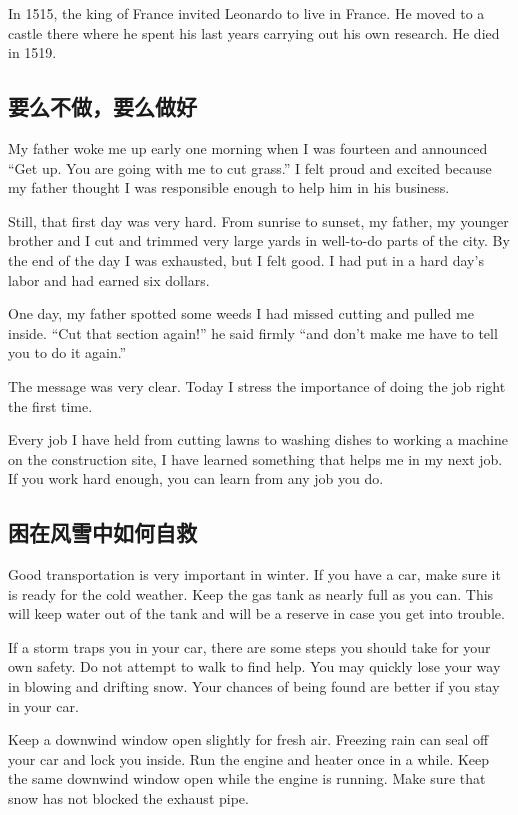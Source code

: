 In 1515, the king of France invited Leonardo to live in
France. He moved to a castle there where he spent his last
years carrying out his own research. He died in 1519.

\subsection{要么不做，要么做好}
My father woke me up early one morning when I was
fourteen and announced “Get up. You are going with me
to cut grass.” I felt proud and excited because my
father thought I was responsible enough to help him in his
business.

Still, that first day was very hard. From sunrise to sunset, my
father, my younger brother and I cut and trimmed very
large yards in well-to-do parts of the city. By
the end of the day I was exhausted, but I felt good. I had
put in a hard day's labor and had earned six dollars.

One day, my father spotted some weeds I had
missed cutting and pulled me inside. “Cut that section
again!” he said firmly “and don't make me have to tell you to do it again.”

The message was very clear. Today I stress the importance
of doing the job right the first time.

Every job I have held from cutting lawns to washing dishes
to working a machine on the construction site, I have
learned something that helps me in my next job. If
you work hard enough, you can learn from any job you
do.
\subsection{困在风雪中如何自救}
Good transportation is very important in winter. If you
have a car, make sure it is ready for the cold weather.
Keep the gas tank as nearly full as you can. This will keep
water out of the tank and will be a reserve in case you get
into trouble.

If a storm traps you in your car, there are some steps
you should take for your own safety. Do not attempt to
walk to find help. You may quickly lose your way in blowing
and drifting snow. Your chances of being found are
better if you stay in your car.

Keep a downwind window open slightly for fresh air. Freezing
rain can seal off your car and lock you inside. Run the
engine and heater once in a while. Keep the same downwind
window open while the engine is running. Make sure
that snow has not blocked the exhaust pipe.

